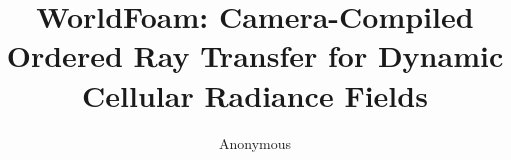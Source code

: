\documentclass{article}
\title{WorldFoam: Camera-Compiled Ordered Ray Transfer for Dynamic Cellular Radiance Fields}
\author{Anonymous}
\begin{document}
\PackageError{worldfoam-venue}{Venue source is still a blocked scaffold}{
  Port the concise Markdown only after G4 and G6 are publication eligible.
  Do not input placeholder fragments or unmeasured rows.
}
\maketitle




\label{worldfoam-main-end}


\end{document}
